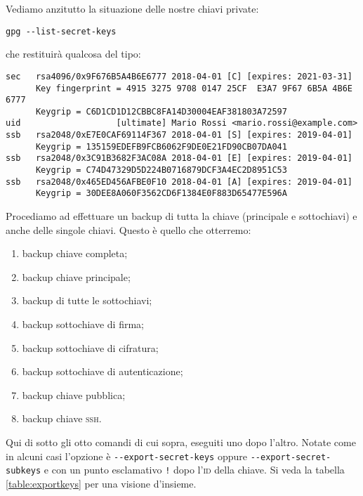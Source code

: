 Vediamo anzitutto la situazione delle nostre chiavi private:

\begin{lstlisting}
gpg --list-secret-keys
\end{lstlisting}

che restituirà qualcosa del tipo:

\begin{lstlisting}
sec   rsa4096/0x9F676B5A4B6E6777 2018-04-01 [C] [expires: 2021-03-31]
      Key fingerprint = 4915 3275 9708 0147 25CF  E3A7 9F67 6B5A 4B6E 6777
      Keygrip = C6D1CD1D12CBBC8FA14D30004EAF381803A72597
uid                   [ultimate] Mario Rossi <mario.rossi@example.com>
ssb   rsa2048/0xE7E0CAF69114F367 2018-04-01 [S] [expires: 2019-04-01]
      Keygrip = 135159EDEFB9FCB6062F9DE0E21FD90CB07DA041
ssb   rsa2048/0x3C91B3682F3AC08A 2018-04-01 [E] [expires: 2019-04-01]
      Keygrip = C74D47329D5D224B0716879DCF3A4EC2D8951C53
ssb   rsa2048/0x465ED456AFBE0F10 2018-04-01 [A] [expires: 2019-04-01]
      Keygrip = 30DEE8A060F3562CD6F1384E0F883D65477E596A
\end{lstlisting}

Procediamo ad effettuare un backup di tutta la chiave (principale e sottochiavi)
e anche delle singole chiavi. Questo è quello che otterremo:

\begin{enumerate}
 \item backup chiave completa;
 \item backup chiave principale;
 \item backup di tutte le sottochiavi;
 \item backup sottochiave di firma;
 \item backup sottochiave di cifratura;
 \item backup sottochiave di autenticazione;
 \item backup chiave pubblica;
 \item backup chiave \textsc{ssh}.
\end{enumerate}

Qui di sotto gli otto comandi di cui sopra, eseguiti uno dopo l'altro. Notate
come in alcuni casi l'opzione è \verb+--export-secret-keys+ oppure
\verb+--export-secret-subkeys+ e con un punto esclamativo
\texttt{!} dopo l'\textsc{id} della chiave. Si veda la
tabella \vref{table:exportkeys} per una visione d'insieme.

